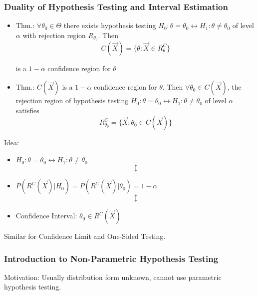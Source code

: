 \documentclass[11pt,a4paper]{ctexart}
\numberwithin{equation}{section}%
\begin{document}
\subsubsection{Duality of Hypothesis Testing and Interval Estimation}

\begin{itemize}
    \item Thm.: $\forall\theta_0\in\Theta$ there exists hypothesis testing $H_0:\theta=\theta_0\longleftrightarrow H_1:\theta\neq\theta_0$ of level $\alpha$ with rejection region $R_{\theta_0}$. Then
    \[
        C(\vec{X})=\{\theta:\vec{X}\in R^C_{\theta}\}
    \]

    is a $1-\alpha$ confidence region for $\theta$

    \item Thm.: $C(\vec{X})$ is a $1-\alpha$ confidence region for $\theta$. Then $\forall\theta_0\in C(\vec{X})$, the rejection region of hypothesis testing $H_0:\theta=\theta_0\longleftrightarrow H_1:\theta\neq\theta_0$ of level $\alpha$ satisfies
    \[
    R^C_{\theta_0}=\{\vec{X}:\theta_0\in C(\vec{X})\}
    \]
\end{itemize}
    
    Idea:
\begin{itemize}[itemsep=-3pt]
    \item[] \centering $H_0:\theta=\theta_0\longleftrightarrow H_1:\theta\neq\theta_0$
    \[\updownarrow\]
    \item[] \centering $P(R^C(\vec{X})|H_0)=P(R^C(\vec{X})|\theta_0)=1-\alpha$
    \[\updownarrow\]
    \item[] Confidence Interval: $\theta_0\in R^C(\vec{X})$
\end{itemize}

    Similar for Confidence Limit and One-Sided Testing.

\subsubsection{Introduction to Non-Parametric Hypothesis Testing}\label{SubSectionNonIntroToParametricHypothesisTesting}

    Motivation: Usually distribution form unknown, cannot use parametric hypothesis testing.
\end{document}
